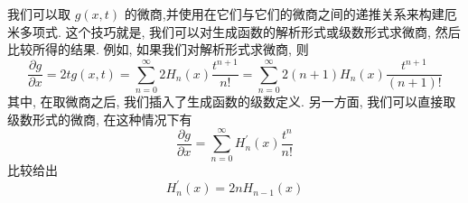 我们可以取 $g\left( {x, t}\right)$ 的微商,并使用在它们与它们的微商之间的递推关系来构建厄米多项式. 这个技巧就是, 我们可以对生成函数的解析形式或级数形式求微商, 然后比较所得的结果. 例如, 如果我们对解析形式求微商, 则
\begin{equation}
\frac{\partial g}{\partial x} = {2tg}\left( {x, t}\right) = \mathop{\sum }\limits_{{n = 0}}^{\infty }2{H}_{n}\left( x\right) \frac{{t}^{n + 1}}{n!} = \mathop{\sum }\limits_{{n = 0}}^{\infty }2\left( {n + 1}\right) {H}_{n}\left( x\right) \frac{{t}^{n + 1}}{\left( {n + 1}\right) !}
\end{equation}
其中, 在取微商之后, 我们插入了生成函数的级数定义. 另一方面, 我们可以直接取级数形式的微商, 在这种情况下有
\begin{equation}
\frac{\partial g}{\partial x} = \mathop{\sum }\limits_{{n = 0}}^{\infty }{H}_{n}^{\prime }\left( x\right) \frac{{t}^{n}}{n!}
\end{equation}
比较给出
\begin{equation}
{H}_{n}^{\prime }\left( x\right) = {2n}{H}_{n - 1}\left( x\right)
\end{equation}

